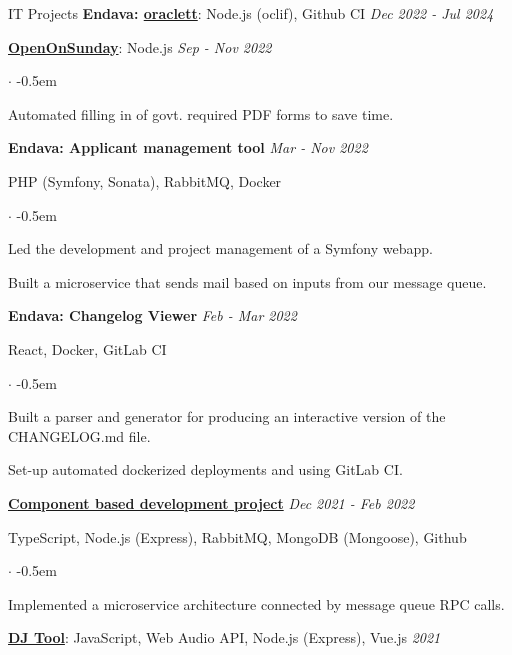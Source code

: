 \documentclass{cv}
\begin{document}
\begin{rSection}{IT Projects}
  \textbf{Endava: \href{https://github.com/jneidel/oraclett}{oraclett}}: Node.js (oclif), Github CI
  \hfill
  {\em Dec 2022 - Jul 2024}

  \textbf{\href{https://openonsunday.com}{OpenOnSunday}}: Node.js
  \hfill
  {\em Sep - Nov 2022}
  \begin{list}{$\cdot$}{}
  \itemsep -0.5em \vspace{-0.5em}
    \smallskip
  \item Automated filling in of govt. required PDF forms to save time.
  \end{list}

  \textbf{Endava: Applicant management tool}
  \hfill
  {\em Mar - Nov 2022}

  PHP (Symfony, Sonata), RabbitMQ, Docker
  \begin{list}{$\cdot$}{}
  \itemsep -0.5em \vspace{-0.5em}
    \smallskip
  \item Led the development and project management of a Symfony webapp.
  \item Built a microservice that sends mail based on inputs from our message queue.
  \end{list}

  \textbf{Endava: Changelog Viewer}
  \hfill
  {\em Feb - Mar 2022}

  React, Docker, GitLab CI
  \begin{list}{$\cdot$}{}
  \itemsep -0.5em \vspace{-0.5em}
    \smallskip
  \item Built a parser and generator for producing an interactive version of the CHANGELOG.md file.
  \item Set-up automated dockerized deployments and using GitLab CI.
  \end{list}

  \textbf{\href{https://github.com/htw-kbe-jneidel/main}{Component based development project}}
  \hfill
  {\em Dec 2021 - Feb 2022}

  TypeScript, Node.js (Express), RabbitMQ, MongoDB (Mongoose), Github
  \begin{list}{$\cdot$}{}
  \itemsep -0.5em \vspace{-0.5em}
    \smallskip
  \item Implemented a microservice architecture connected by message queue RPC calls.
  \end{list}

  \textbf{\href{https://github.com/vyvytn/avt}{DJ Tool}}: JavaScript, Web Audio API, Node.js (Express), Vue.js
  \hfill
  {\em 2021}


\end{rSection}
\end{document}
